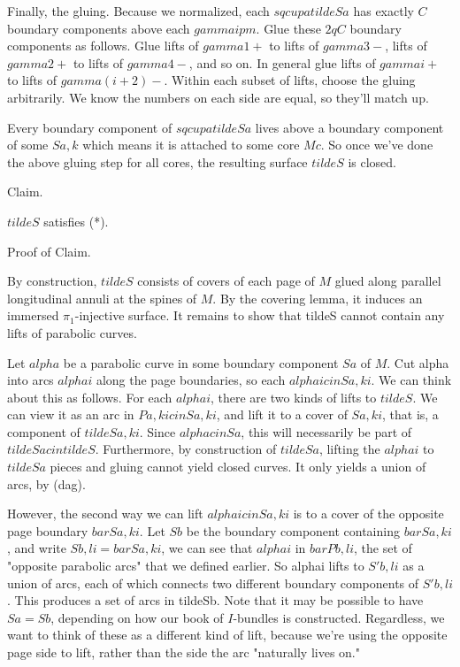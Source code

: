 \documentclass[12pt]{amsart}
\theoremstyle{definition}
\theoremstyle{remark}
\begin{document}
Finally, the gluing. Because we normalized, each $sqcup a tildeSa$ has exactly
$C$ boundary components above each $gammaipm$.  Glue these $2qC$ boundary
components as follows. Glue lifts of $gamma1+$ to lifts of $gamma3-$, lifts of
$gamma2+$ to lifts of $gamma4-$, and so on. In general glue lifts of $gammai+$
to lifts of $gamma(i+2)-$. Within each subset of lifts, choose the gluing
arbitrarily. We know the numbers on each side are equal, so they'll match up.

Every boundary component of $sqcup a tildeSa$ lives above a boundary component
of some $Sa,k$ which means it is attached to some core $Mc$. So once we've done
the above gluing step for all cores, the resulting surface $tildeS$ is closed.

Claim.

$tildeS$ satisfies (*).

Proof of Claim.

By construction, $tildeS$ consists of covers of each page of $M$ glued along
parallel longitudinal annuli at the spines of $M$. By the covering lemma, it
induces an immersed $\pi_1$-injective surface. It remains to show that tildeS
cannot contain any lifts of parabolic curves.

Let $alpha$ be a parabolic curve in some boundary component $Sa$ of $M$. Cut
alpha into arcs $alphai$ along the page boundaries, so each $alphai cin Sa,ki$.
We can think about this as follows. For each $alphai$, there are two kinds of
lifts to $tildeS$. We can view it as an arc in $Pa,ki cin Sa,ki$, and lift it
to a cover of $Sa,ki$, that is, a component of $tildeSa,ki$. Since $alpha cin
Sa$, this will necessarily be part of $tildeSa cin tildeS$. Furthermore, by
construction of $tildeSa$, lifting the $alphai$ to $tildeSa$ pieces and gluing
cannot yield closed curves.  It only yields a union of arcs, by (dag).

However, the second way we can lift $alphai cin Sa,ki$ is to a cover of the
opposite page boundary $barSa,ki$. Let $Sb$ be the boundary component
containing $barSa,ki$, and write $Sb,li = barSa,ki$, we can see that $alphai$
in $barPb,li$, the set of "opposite parabolic arcs" that we defined earlier.
So alphai lifts to $S'b,li$ as a union of arcs, each of which connects two
different boundary components of $S'b,li$. This produces a set of arcs in
tildeSb. Note that it may be possible to have $Sa = Sb$, depending on how our
book of $I$-bundles is constructed.  Regardless, we want to think of these as
a different kind of lift, because we're using the opposite page side to lift,
rather than the side the arc "naturally lives on."
\end{document}
